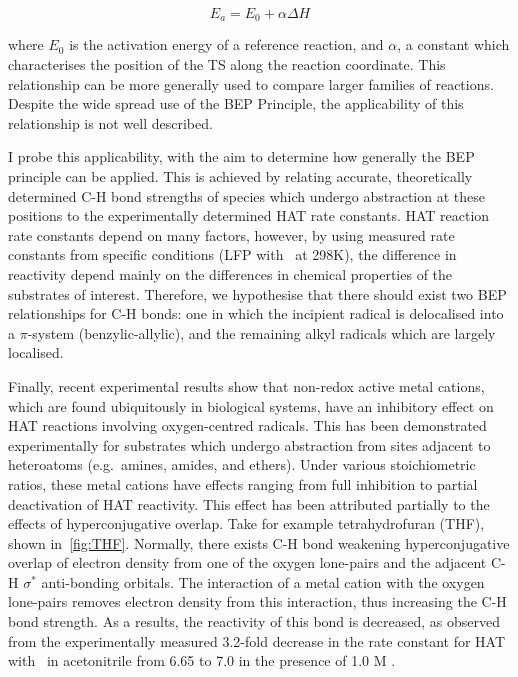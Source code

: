 \begin{equation}
  E_a = E_0 + \alpha \Delta H
  \label{eq:bep}
\end{equation}

\noindent where $E_0$ is the activation energy of a reference reaction, and $\alpha$, a constant which characterises the position of the TS along the reaction coordinate. This relationship can be more generally used to compare larger families of reactions. Despite the wide spread use of the BEP Principle, the applicability of this relationship is not well described.

I probe this applicability, with the aim to determine how generally the BEP principle can be applied. This is achieved by relating accurate, theoretically determined C-H bond strengths of species which undergo abstraction at these positions to the experimentally determined HAT rate constants. HAT reaction rate constants depend on many factors, however, by using measured rate constants from specific conditions (LFP with \cumo~at 298K), the difference in reactivity depend mainly on the differences in chemical properties of the substrates of interest. Therefore, we hypothesise that there should exist two BEP relationships for C-H bonds: one in which the incipient radical is delocalised into a $\pi$-system (benzylic-allylic), and the remaining alkyl radicals which are largely localised.

Finally, recent experimental results show that non-redox active metal cations, which are found ubiquitously in biological systems, have an inhibitory effect on HAT reactions involving oxygen-centred radicals. This has been demonstrated experimentally for substrates which undergo abstraction from sites adjacent to heteroatoms (e.g.\ amines, amides, and ethers). Under various stoichiometric ratios, these metal cations have effects ranging from full inhibition to partial deactivation of HAT reactivity.\cite{Salamone2013, Salamone2015metals, Salamone2016} This effect has been attributed partially to the effects of hyperconjugative overlap. Take for example tetrahydrofuran (THF), shown in~\ref{fig:THF}. Normally, there exists C-H bond weakening hyperconjugative overlap of electron density from one of the oxygen lone-pairs and the adjacent C-H $\sigma^*$ anti-bonding orbitals. The interaction of a metal cation with the oxygen lone-pairs removes electron density from this interaction, thus increasing the C-H bond strength. As a results, the reactivity of this bond is decreased, as observed from the experimentally measured 3.2-fold decrease in the rate constant for HAT with \cumo~in acetonitrile from 6.65  \Ms to 7.0  \Ms in the presence of 1.0 M .\cite{Salamone2013}

